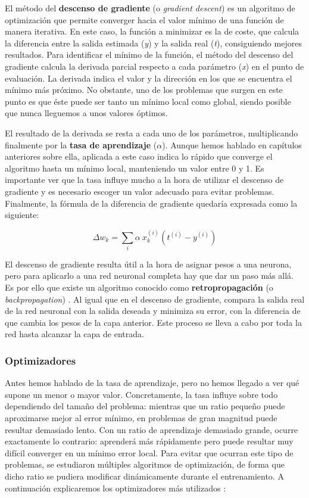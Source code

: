 El método del \textbf{descenso de gradiente} (o \textit{gradient descent}) \citep[cap. 2]{Buduma:general} es un algoritmo de optimización que permite converger hacia el valor mínimo de una función de manera iterativa. En este caso, la función a minimizar es la de coste, que calcula la diferencia entre la salida estimada (\textit{y}) y la salida real (\textit{t}), consiguiendo mejores resultados. Para identificar el mínimo de la función, el método del descenso del gradiente calcula la derivada parcial respecto a cada parámetro (\textit{x}) en el punto de evaluación. La derivada indica el valor y la dirección en los que se encuentra el mínimo más próximo. No obstante, uno de los problemas que surgen en este punto es que éste puede ser tanto un mínimo local como global, siendo posible que nunca lleguemos a unos valores óptimos.

El resultado de la derivada se resta a cada uno de los parámetros, multiplicando finalmente por la \textbf{tasa de aprendizaje} ($\alpha$). Aunque hemos hablado en capítulos anteriores sobre ella, aplicada a este caso indica lo rápido que converge el algoritmo hasta un mínimo local, manteniendo un valor entre 0 y 1. Es importante ver que la tasa influye mucho a la hora de utilizar el descenso de gradiente y es necesario escoger un valor adecuado para evitar problemas. Finalmente, la fórmula de la diferencia de gradiente quedaría expresada como la siguiente:

$$\Delta w_{k} = \sum_{i} \alpha\ x_{k}^{(i)} (t^{(i)} - y^{(i)} )$$

El descenso de gradiente resulta útil a la hora de asignar pesos a una neurona, pero para aplicarlo a una red neuronal completa hay que dar un paso más allá. Es por ello que existe un algoritmo conocido como \textbf{retropropagación} (o \textit{backpropagation}) \citep[cap. 2]{Buduma:general}. Al igual que en el descenso de gradiente, compara la salida real de la red neuronal con la salida deseada y minimiza su error, con la diferencia de que cambia los pesos de la capa anterior. Este proceso se lleva a cabo por toda la red hasta alcanzar la capa de entrada.

\subsubsection{Optimizadores}
Antes hemos hablado de la tasa de aprendizaje, pero no hemos llegado a ver qué supone un menor o mayor valor. Concretamente, la tasa influye sobre todo dependiendo del tamaño del problema: mientras que un ratio pequeño puede aproximarse mejor al error mínimo, en problemas de gran magnitud puede resultar demasiado lento. Con un ratio de aprendizaje demasiado grande, ocurre exactamente lo contrario: aprenderá más rápidamente pero puede resultar muy difícil converger en un mínimo error local. 
Para evitar que ocurran este tipo de problemas, se estudiaron múltiples algoritmos de optimización, de forma que dicho ratio se pudiera modificar dinámicamente durante el entrenamiento. A continuación explicaremos los optimizadores más utilizados \citep{NIPS2017_7003}:

